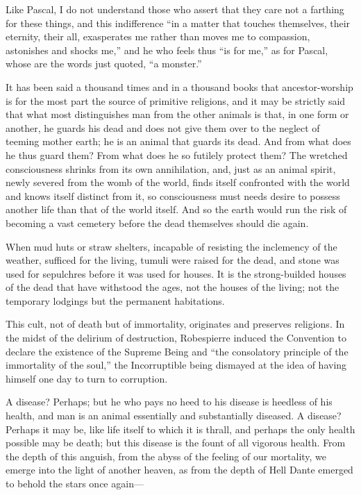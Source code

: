 Like Pascal, I do not understand those who assert that they care not a
farthing for these things, and this indifference ``in a matter that
touches themselves, their eternity, their all, exasperates me rather
than moves me to compassion, astonishes and shocks me,'' and he who
feels thus ``is for me,'' as for Pascal, whose are the words just
quoted, ``a monster.''

It has been said a thousand times and in a thousand  books
that ancestor-worship is for the most part the source of primitive
religions, and it may be strictly said that what most distinguishes
man from the other animals is that, in one form or another, he guards
his dead and does not give them over to the neglect of teeming mother
earth; he is an animal that guards its dead. And from what does he
thus guard them? From what does he so futilely protect them? The
wretched consciousness shrinks from its own annihilation, and, just as
an animal spirit, newly severed from the womb of the world, finds
itself confronted with the world and knows itself distinct from it, so
consciousness must needs desire to possess another life than that of
the world itself. And so the earth would run the risk of becoming a
vast cemetery before the dead themselves should die again.

When mud huts or straw shelters, incapable of resisting the inclemency
of the weather, sufficed for the living, tumuli were raised for the
dead, and stone was used for sepulchres before it was used for houses.
It is the strong-builded houses of the dead that have withstood the
ages, not the houses of the living; not the temporary lodgings but the
permanent habitations.

This cult, not of death but of immortality, originates and preserves
religions. In the midst of the delirium of destruction, Robespierre
induced the Convention to declare the existence of the Supreme Being
and ``the consolatory principle of the immortality of the soul,'' the
Incorruptible being dismayed at the idea of having himself one day to
turn to corruption.

A disease? Perhaps; but he who pays no heed to his disease is heedless
of his health, and man is an animal essentially and substantially
diseased. A disease? Perhaps it may be, like life itself to which it
is thrall, and perhaps the only health possible may be death; but this
disease is the fount of all vigorous health. From the depth of this
anguish, from the abyss of the feeling of our mortality, we emerge
into the light of another  heaven, as from the depth of Hell
Dante emerged to behold the stars once again---

